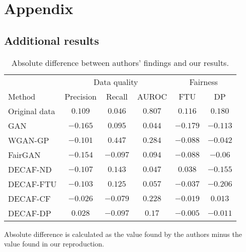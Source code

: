 \newpage
\section*{Appendix}
\subsection{Additional results}

\begin{table}[h]\centering
    \caption{Absolute difference between authors' findings and our results.}
    \label{tab:exp2}
    \begin{tabular}{l|ccccc}
        
    \hline 
                    & \multicolumn{3}{c|}{Data quality}                & \multicolumn{2}{c}{Fairness} \\ \cline{2-6} 
    Method          & Precision & Recall & \multicolumn{1}{c|}{AUROC} & FTU           & DP           \\ \hline   
    Original data & $0.109$     & $0.046$  & \multicolumn{1}{c|}{$ 0.807 $} & $0.116$  & $ 0.180$      \\
    GAN             & $-0.165$ & $0.095$ & \multicolumn{1}{c|}{$0.044$} & $-0.179$   & $-0.113$  \\
    WGAN-GP         & $-0.101$ & $0.447$ & \multicolumn{1}{c|}{$0.284$} & $-0.088$   & $-0.042$  \\
    FairGAN         & $-0.154$ & $-0.097$ & \multicolumn{1}{c|}{$0.094$} & $-0.088$   & $-0.06$  \\
    DECAF-ND        & $-0.107$ & $0.143$ & \multicolumn{1}{c|}{$0.047$} & $0.038$   & $-0.155$  \\
    DECAF-FTU       & $-0.103$ & $0.125$ & \multicolumn{1}{c|}{$0.057$} & $-0.037$   & $-0.206$  \\
    DECAF-CF        & $-0.026$ & $-0.079$ & \multicolumn{1}{c|}{$0.228$} & $-0.019$   & $0.013$  \\
    DECAF-DP        & $0.028$ & $-0.097$ & \multicolumn{1}{c|}{$0.17$} & $-0.005$   & $-0.011$ \\ \hline
    \end{tabular}
    \end{table}
    
    Absolute difference is calculated as the value found by the authors minus the value found in our reproduction.
    
